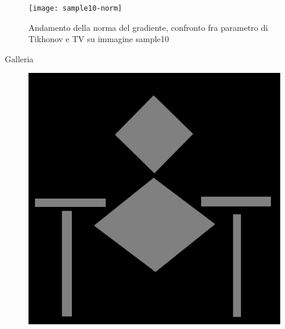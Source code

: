 \documentclass[12pt]{article}
\begin{document}
%
\makeatletter
\setlength{\@fptop}{0pt}
\makeatother
%
    \begin{figure}[t!]
    \centering
    \texttt{[image: sample10-norm]}
    \caption{Andamento della norma del gradiente, confronto fra parametro di Tikhonov e TV su immagine sample10}
    \label{graph:6}
    \end{figure}

    \clearpage
    \listoffigures
    \newpage
    \listoftables

\cleardoublepage
    \centering
    \huge
    Galleria
\cleardoublepage

    \begin{figure}[h!]
    \centering
    \includegraphics[width=14cm]{sample1}
    \end{figure}
    \newpage
\end{document}
